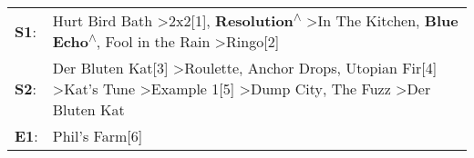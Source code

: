 \begin{supertabular}{p{0.03\textwidth}p{0.92\textwidth}}
 \textbf{S1}:  &                                                                             Hurt Bird Bath\textsuperscript{} \textgreater \enspace 2x2[1]\textsuperscript{}, \enspace \textbf{Resolution\textsuperscript{$\wedge$}} \textgreater \enspace In The Kitchen\textsuperscript{}, \enspace \textbf{Blue Echo\textsuperscript{$\wedge$}}, \enspace Fool in the Rain\textsuperscript{} \textgreater \enspace Ringo[2]\textsuperscript{}  \enspace  \\
 \textbf{S2}:  &  Der Bluten Kat[3]\textsuperscript{} \textgreater \enspace Roulette\textsuperscript{}, \enspace Anchor Drops\textsuperscript{}, \enspace Utopian Fir[4]\textsuperscript{} \textgreater \enspace Kat's Tune\textsuperscript{} \textgreater \enspace Example 1[5]\textsuperscript{} \textgreater \enspace Dump City\textsuperscript{}, \enspace The Fuzz\textsuperscript{} \textgreater \enspace Der Bluten Kat\textsuperscript{}  \enspace  \\
 \textbf{E1}:  &                                                                                                                                                                                                                                                                                                                                                                                                Phil's Farm[6]\textsuperscript{}  \enspace  \\
\end{supertabular}
